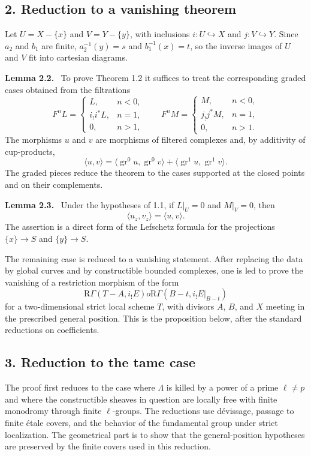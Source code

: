\documentclass[12pt]{article}
\newcommand{\R}{\mathrm R}
\newenvironment{statement}[1]{\par\medskip\noindent\textbf{#1.}\ }{\par\medskip}
\begin{document}
\subsection*{2. Reduction to a vanishing theorem}
Let $U=X-\{x\}$ and $V=Y-\{y\}$, with inclusions $i:U\hookrightarrow X$ and $j:V\hookrightarrow Y$. Since $a_2$ and $b_1$ are finite, $a_2^{-1}(y)=s$ and $b_1^{-1}(x)=t$, so the inverse images of $U$ and $V$ fit into cartesian diagrams.

\begin{statement}{Lemma 2.2}
To prove Theorem 1.2 it suffices to treat the corresponding graded cases obtained from the filtrations
\[
F^nL=\begin{cases}L,& n<0,\\ i_!i^*L,& n=1,\\0,& n>1,
\end{cases}
\qquad
F^nM=\begin{cases}M,& n<0,\\ j_!j^*M,& n=1,\\0,& n>1.
\end{cases}
\]
The morphisms $u$ and $v$ are morphisms of filtered complexes and, by additivity of cup-products,
\[
   \langle u,v\rangle=
   \langle \operatorname{gr}^0u,\operatorname{gr}^0v\rangle+
   \langle \operatorname{gr}^1u,\operatorname{gr}^1v\rangle.
\]
The graded pieces reduce the theorem to the cases supported at the closed points and on their complements.
\end{statement}

\begin{statement}{Lemma 2.3}
Under the hypotheses of 1.1, if $L|_U=0$ and $M|_V=0$, then
\[
   \langle u_z,v_z\rangle=\langle u,v\rangle.
\]
The assertion is a direct form of the Lefschetz formula for the projections $\{x\}\to S$ and $\{y\}\to S$.
\end{statement}

The remaining case is reduced to a vanishing statement. After replacing the data by global curves and by constructible bounded complexes, one is led to prove the vanishing of a restriction morphism of the form
\[
   \R\Gamma(T-A,i_!E)	o \R\Gamma(B-t,i_!E|_{B-t})
\]
for a two-dimensional strict local scheme $T$, with divisors $A$, $B$, and $X$ meeting in the prescribed general position. This is the proposition below, after the standard reductions on coefficients.

\subsection*{3. Reduction to the tame case}
The proof first reduces to the case where $\Lambda$ is killed by a power of a prime $\ell\ne p$ and where the constructible sheaves in question are locally free with finite monodromy through finite $\ell$-groups. The reductions use dévissage, passage to finite étale covers, and the behavior of the fundamental group under strict localization. The geometrical part is to show that the general-position hypotheses are preserved by the finite covers used in this reduction.
\end{document}

